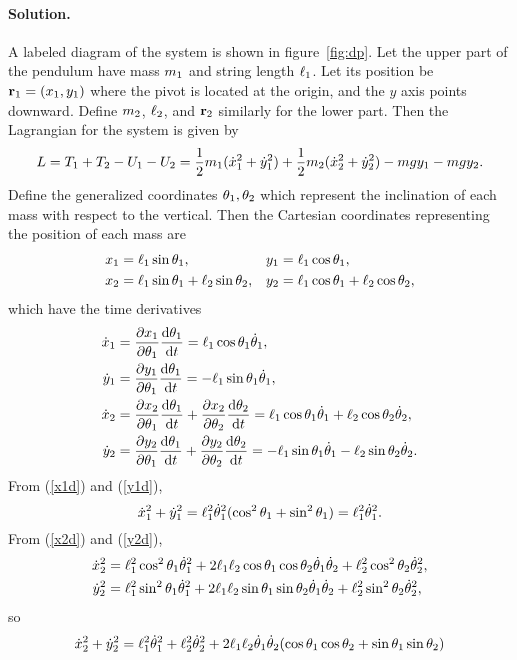 \documentclass[11pt]{article}
\newcommand{\refeq}[1]{(\ref{#1})}
\newenvironment{solution}
{
    \paragraph{Solution.}
    \ignorespaces
}
{
    \bigskip
}
\begin{document}
\begin{solution}
	A labeled diagram of the system is shown in figure~\ref{fig:dp}.  Let the upper part of the pendulum have mass $m_1$ and string length $\ell_1$.  Let its position be $\mathbf{r}_1 = (x_1, y_1)$ where the pivot is located at the origin, and the $y$ axis points downward.  Define $m_2$, $\ell_2$, and $\mathbf{r}_2$ similarly for the lower part.  Then the Lagrangian for the system is given by
	\begin{equation} \label{lagrdp}
		L = T_1 + T_2 - U_1 - U_2 = \frac{1}{2} m_1 (\dot{x}_1^2 + \dot{y}_1^2) + \frac{1}{2} m_2 (\dot{x}_2^2 + \dot{y}_2^2) - m g y_1 - m g y_2.
	\end{equation}
	Define the generalized coordinates $\theta_1, \theta_2$ which represent the inclination of each mass with respect to the vertical.  Then the Cartesian coordinates representing the position of each mass are
	\begin{align}
		x_1 &= \ell_1 \sin{\theta_1}, &
		y_1 &= \ell_1 \cos{\theta_1}, \\
		x_2 &= \ell_1 \sin{\theta_1} + \ell_2 \sin{\theta_2}, &
		y_2 &= \ell_1 \cos{\theta_1} + \ell_2 \cos{\theta_2},
	\end{align}
	which have the time derivatives
	\begin{align}
		\dot{x}_1 &= \pdv{x_1}{\theta_1} \dv{\theta_1}{t} = \ell_1 \cos{\theta_1} \dot{\theta}_1, \label{x1d} \\
		\dot{y}_1 &= \pdv{y_1}{\theta_1} \dv{\theta_1}{t} = -\ell_1 \sin{\theta_1} \dot{\theta}_1, \label{y1d} \\
		\dot{x}_2 &= \pdv{x_2}{\theta_1} \dv{\theta_1}{t} + \pdv{x_2}{\theta_2} \dv{\theta_2}{t} = \ell_1 \cos{\theta_1} \dot{\theta}_1 + \ell_2 \cos{\theta_2} \dot{\theta}_2, \label{x2d} \\
		\dot{y}_2 &= \pdv{y_2}{\theta_1} \dv{\theta_1}{t} + \pdv{y_2}{\theta_2} \dv{\theta_2}{t} = -\ell_1 \sin{\theta_1} \dot{\theta}_1 - \ell_2 \sin{\theta_2} \dot{\theta}_2. \label{y2d}
	\end{align}
	From \refeq{x1d} and \refeq{y1d},
	\begin{equation}
		\dot{x}_1^2 + \dot{y}_1^2 = \ell_1^2 \dot{\theta}_1^2 (\cos^2{\theta_1} + \sin^2{\theta_1}) = \ell_1^2 \dot{\theta}_1^2.
	\end{equation}
	From \refeq{x2d} and \refeq{y2d},
	\begin{align}
		\dot{x}_2^2 &= \ell_1^2 \cos^2{\theta_1} \dot{\theta}_1^2 + 2 \ell_1 \ell_2 \cos{\theta_1} \cos{\theta_2} \dot{\theta}_1 \dot{\theta}_2 + \ell_2^2 \cos^2{\theta_2} \dot{\theta}_2^2, \\
		\dot{y}_2^2 &= \ell_1^2 \sin^2{\theta_1} \dot{\theta}_1^2 + 2 \ell_1 \ell_2 \sin{\theta_1} \sin{\theta_2} \dot{\theta}_1 \dot{\theta}_2 + \ell_2^2 \sin^2{\theta_2} \dot{\theta}_2^2,
	\end{align}
	so
	\begin{align}
		\xdw^2 + \ydw^2 &= \elq^2 \thdq^2 + \elw^2 \thdw^2 + 2 \elq \elw \thdq \thdw (\cos{\thq} \cos{\thw} + \sin{\thq} \sin{\thw}) \\

\end{align}
\end{solution}
\end{document}
